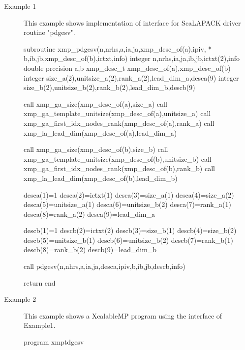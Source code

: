 \begin{description}

\item[Example 1]
   This example shows implementation of {\XMPF} interface for ScaLAPACK driver routine "pdgesv".

\begin{XFexample}
      subroutine xmp_pdgesv(n,nrhs,a,ia,ja,xmp_desc_of(a),ipiv,
     *                b,ib,jb,xmp_desc_of(b),ictxt,info)
      integer n,nrhs,ia,ja,ib,jb,ictxt(2),info
      double precision a,b
      xmp_desc_t xmp_desc_of(a),xmp_desc_of(b)
      integer size_a(2),unitsize_a(2),rank_a(2),lead_dim_a,desca(9)
      integer size_b(2),unitsize_b(2),rank_b(2),lead_dim_b,descb(9)
      
      call xmp_ga_size(xmp_desc_of(a),size_a)
      call xmp_ga_template_unitsize(xmp_desc_of(a),unitsize_a)
      call xmp_ga_first_idx_nodes_rank(xmp_desc_of(a),rank_a)
      call xmp_la_lead_dim(xmp_desc_of(a),lead_dim_a)
      
      call xmp_ga_size(xmp_desc_of(b),size_b)
      call xmp_ga_template_unitsize(xmp_desc_of(b),unitsize_b)
      call xmp_ga_first_idx_nodes_rank(xmp_desc_of(b),rank_b)
      call xmp_la_lead_dim(xmp_desc_of(b),lead_dim_b)
      
      desca(1)=1
      desca(2)=ictxt(1)
      desca(3)=size_a(1)
      desca(4)=size_a(2)
      desca(5)=unitsize_a(1)
      desca(6)=unitsize_b(2)
      desca(7)=rank_a(1)
      desca(8)=rank_a(2)
      desca(9)=lead_dim_a
      
      descb(1)=1
      descb(2)=ictxt(2)
      descb(3)=size_b(1)
      descb(4)=size_b(2)
      descb(5)=unitsize_b(1)
      descb(6)=unitsize_b(2)
      descb(7)=rank_b(1)
      descb(8)=rank_b(2)
      descb(9)=lead_dim_b
      
      call pdgesv(n,nhrs,a,ia,ja,desca,ipiv,b,ib,jb,descb,info)
      
      return
      end

\end{XFexample}


\item[Example 2]
     This example shows a XcalableMP program using the interface of Example1. 

\begin{XFexample}
      program xmptdgesv


\end{XFexample}
\end{description}
